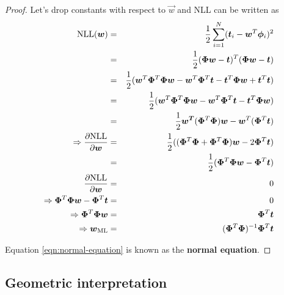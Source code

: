 \begin{proof}
Let's drop constants with respect to $\vec{w}$ and NLL can be written as
\begin{eqnarray*}
\text{NLL}(\vec{w}) 
&=&\dfrac{1}{2}\sum\limits_{i=1}^N (\vec{t}_i-\vec{w}^T\vec{\phi}_i)^2 \\
&=&\dfrac{1}{2}(\vec{\Phi}\vec{w}-\vec{t})^T(\vec{\Phi}\vec{w}-\vec{t}) \\
&=&\frac{1}{2} (\vec{w}^T\vec{\Phi}^T\vec{\Phi}\vec{w}-\vec{w}^T\vec{\Phi}^T\vec{t}-\vec{t}^T\vec{\Phi}\vec{w}+\vec{t}^T\vec{t}) \\
&=&\frac{1}{2} (\vec{w}^T\vec{\Phi}^T\vec{\Phi}\vec{w}-\vec{w}^T\vec{\Phi}^T\vec{t}-\vec{t}^T\vec{\Phi}\vec{w}) \\
&=&\dfrac{1}{2} \vec{w^T} (\vec{\Phi}^T\vec{\Phi})\vec{w} -\vec{w}^T(\vec{\Phi}^T\vec{t}) \\
\Rightarrow
\frac{\partial \text{NLL}}{\partial\vec{w}} &=& \frac{1}{2} ((\vec{\Phi}^T\vec{\Phi}+\vec{\Phi}^T\vec{\Phi})\vec{w} -2\vec{\Phi}^T\vec{t}) \nonumber \\
&=& \frac{1}{2} (\vec{\Phi}^T\vec{\Phi}\vec{w} - \vec{\Phi}^T\vec{t}) \nonumber \\
\frac{\partial \text{NLL}}{\partial\vec{w}} &=& 0 \\
\Rightarrow \vec{\Phi}^T\vec{\Phi}\vec{w} - \vec{\Phi}^T\vec{t} &=& 0 \nonumber \\
\Rightarrow \vec{\Phi}^T\vec{\Phi}\vec{w} &=& \vec{\Phi}^T\vec{t} \label{eqn:normal-equation} \\
\Rightarrow \vec{w}}_{\mathrm{ML} &=& (\vec{\Phi}^T\vec{\Phi})^{-1}\vec{\Phi}^T\vec{t} \nonumber
\end{eqnarray*}

Equation \ref{eqn:normal-equation} is known as the \textbf{normal equation}.
\end{proof}

\subsection{Geometric interpretation}

